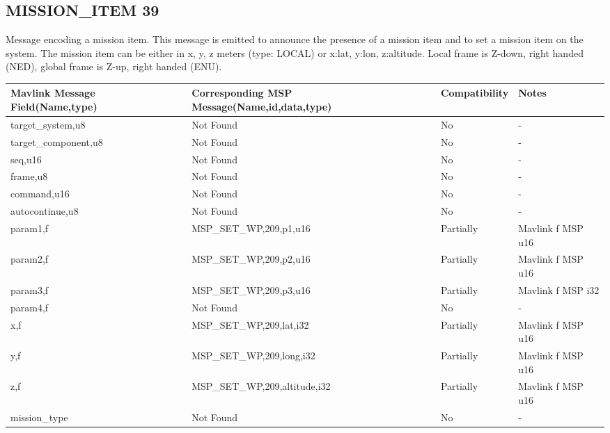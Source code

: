 \cleardoublepage



\subsection{MISSION\_ITEM 39 } 
Message encoding a mission item. This message is emitted to announce the presence of a mission item and to set a mission item on the system. The mission item can be either in x, y, z meters (type: LOCAL) or x:lat, y:lon, z:altitude. Local frame is Z-down, right handed (NED), global frame is Z-up, right handed (ENU).\\

{
\centering
\begin{tabular}{ |p{4cm  } |p{7cm} | p{2cm}|m{5em}|}
\hline
Mavlink Message Field(Name,type)&Corresponding MSP Message(Name,id,data,type)& Compatibility & Notes\\
\hline
target\_system,u8 & Not Found & No & - \\
\hline
target\_component,u8 & Not Found & No & - \\
\hline
seq,u16 & Not Found & No & - \\
\hline
frame,u8 & Not Found & No & - \\
\hline
command,u16 & Not Found & No & - \\
\hline
autocontinue,u8 & Not Found & No & - \\
\hline
\rowcolor{lightgray}
param1,f & MSP\_SET\_WP,209,p1,u16& Partially & Mavlink f MSP u16 \\
\hline
\rowcolor{lightgray}
param2,f & MSP\_SET\_WP,209,p2,u16& Partially & Mavlink f MSP u16 \\
\hline
\rowcolor{lightgray}
param3,f & MSP\_SET\_WP,209,p3,u16& Partially & Mavlink f MSP i32 \\
\hline
param4,f & Not Found & No & - \\
\hline
\rowcolor{lightgray}
x,f & MSP\_SET\_WP,209,lat,i32& Partially & Mavlink f MSP u16 \\
\hline
\rowcolor{lightgray}
y,f & MSP\_SET\_WP,209,long,i32& Partially & Mavlink f MSP u16 \\
\hline
\rowcolor{lightgray}
z,f & MSP\_SET\_WP,209,altitude,i32& Partially & Mavlink f MSP u16 \\
\hline
mission\_type &  Not Found & No & - \\

\end{tabular}
}

